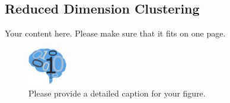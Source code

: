 \documentclass[simplex.tex]{subfiles}
\begin{document}
\subsection{Reduced Dimension Clustering}
Your content here. Please make sure that it fits on one page.

\begin{figure}[!h]
\begin{cframed}
\centering
\includegraphics[width=0.15\textwidth]{neurodata_small.png}
\caption{Please provide a detailed caption for your figure.}
\label{fig:meda}
\end{cframed}
\end{figure}
%
%
%
%
%
\end{document}
